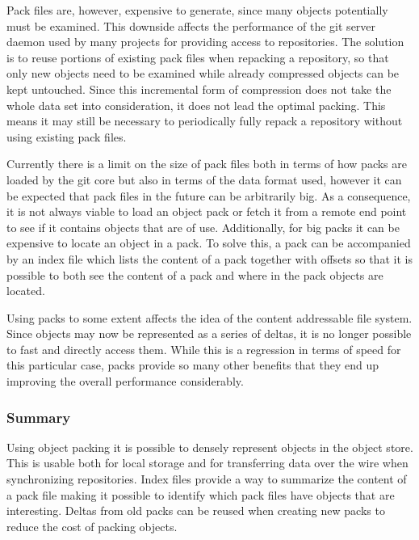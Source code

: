 Pack files are, however, expensive to generate, since many objects
potentially must be examined. This downside affects the performance of
the git server daemon used by many projects for providing access to
repositories. The solution is to reuse portions of existing pack files
when repacking a repository, so that only new objects need to be
examined while already compressed objects can be kept untouched. Since
this incremental form of compression does not take the whole data set
into consideration, it does not lead the optimal packing. This means
it may still be necessary to periodically fully repack a repository
without using existing pack files.

Currently there is a limit on the size of pack files both in terms of
how packs are loaded by the git core but also in terms of the data
format used, however it can be expected that pack files in the future
can be arbitrarily big. As a consequence, it is not always viable to
load an object pack or fetch it from a remote end point to see if it
contains objects that are of use. Additionally, for big packs it can
be expensive to locate an object in a pack. To solve this, a pack can
be accompanied by an index file which lists the content of a pack
together with offsets so that it is possible to both see the content
of a pack and where in the pack objects are located.



Using packs to some extent affects the idea of the content addressable
file system. Since objects may now be represented as a series of
deltas, it is no longer possible to fast and directly access them.
While this is a regression in terms of speed for this particular case,
packs provide so many other benefits that they end up
improving the overall performance considerably.


\subsubsection*{Summary}

Using object packing it is possible to densely represent objects in
the object store. This is usable both for local storage and for
transferring data over the wire when synchronizing repositories. Index
files provide a way to summarize the content of a pack file making it
possible to identify which pack files have objects that are
interesting. Deltas from old packs can be reused when creating new
packs to reduce the cost of packing objects.

